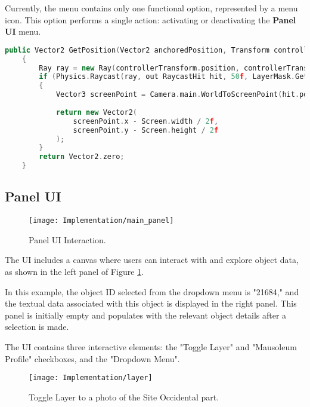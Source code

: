 Currently, the menu contains only one functional option, represented by a menu icon. This option performs a single action: activating or deactivating the \textbf{Panel \gls{UI}} menu.

\begin{lstlisting}[language=C++, caption={Method used to get the position that was pointed by the controller ray.}, label={lst:menu_raycast}]
    public Vector2 GetPosition(Vector2 anchoredPosition, Transform controllerTransform)
    {
        Ray ray = new Ray(controllerTransform.position, controllerTransform.forward);
        if (Physics.Raycast(ray, out RaycastHit hit, 50f, LayerMask.GetMask("Default")))
        {
            Vector3 screenPoint = Camera.main.WorldToScreenPoint(hit.point);
            
            return new Vector2(
                screenPoint.x - Screen.width / 2f,
                screenPoint.y - Screen.height / 2f
            );
        }
        return Vector2.zero;
    }
\end{lstlisting}


\subsection*{Panel \gls{UI}}
\label{sec:panel_UI}
\begin{figure}[h!]
    \centering
    \texttt{[image: Implementation/main\_panel]}
    \caption{Panel \gls{UI} Interaction.}
    \label{fig:main_panel}    
\end{figure}

The \gls{UI} includes a canvas where users can interact with and explore object data, as shown in the left panel of Figure \ref{fig:main_panel}. 

In this example, the object ID selected from the dropdown menu is "21684," and the textual data associated with this object is displayed in the right panel. 
This panel is initially empty and populates with the relevant object details after a selection is made. 

The \gls{UI} contains three interactive elements: the "Toggle Layer" and "Mausoleum Profile" checkboxes, and the "Dropdown Menu".

 \begin{figure}[h!]
    \centering
    \texttt{[image: Implementation/layer]}
    \caption{Toggle Layer to a photo of the Site Occidental part.}
    \label{fig:toggle_layer}    
\end{figure}


